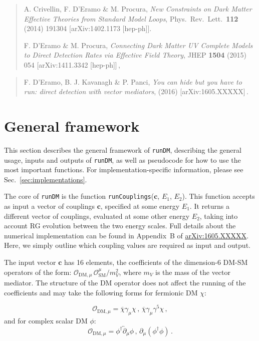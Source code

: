 \documentclass[notitlepage,12pt]{article}
\newcommand{\runDM}{\texttt{runDM}\xspace}
\newcommand{\ourpaper}{\href{http://arxiv.org/abs/1605.XXXXX}{arXiv:1605.XXXXX}\xspace}
\begin{document}
\begin{quote}

 A. Crivellin, F. D'Eramo \& M. Procura, \textit{New Constraints on Dark Matter Effective Theories from Standard Model Loops}, Phys.\ Rev.\ Lett.\  {\bf 112} (2014) 191304 [arXiv:1402.1173 [hep-ph]].

F. D'Eramo \& M. Procura, \textit{Connecting Dark Matter UV Complete Models to Direct Detection Rates via Effective Field Theory}, JHEP {\bf 1504} (2015) 054 [arXiv:1411.3342 [hep-ph]]\,,
\end{quote}

\begin{quote}
F. D'Eramo, B. J. Kavanagh \& P. Panci, \textit{You can hide but you have to run: direct detection with vector mediators}, (2016) [arXiv:1605.XXXXX]\,.
\end{quote}


\section{General framework}

This section describes the general framework of \runDM, describing the general usage, inputs and outputs of \runDM, as well as pseudocode for how to use the most important functions. For implementation-specific information, please see Sec.~\ref{sec:implementations}.

The core of \runDM is the function \texttt{runCouplings}($\mathbf{c}$, $E_1$, $E_2$). This function accepts as input a vector of couplings $\mathbf{c}$, specified at some energy $E_1$. It returns a different vector of couplings, evaluated at some other energy $E_2$, taking into account RG evolution between the two energy scales. Full details about the numerical implementation can be found in Appendix~B of \ourpaper. Here, we simply outline which coupling values are required as input and output.

The input vector  $\mathbf{c}$ has 16 elements, the coefficients of the dimension-6 DM-SM operators of the form: $\mathcal{O}_{\mathrm{DM},\mu} \, \mathcal{O}_\mathrm{SM}^\mu/m_V^2$, where $m_V$ is the mass of the vector mediator. The structure of the DM operator does not affect the running of the coefficients and may take the following forms for fermionic DM $\chi$:

\begin{equation}
\mathcal{O}_{\mathrm{DM},\mu} = \overline{\chi}\gamma_\mu \chi\,, \,\overline{\chi} \gamma_\mu \gamma^5 \chi\,,
\end{equation}
and for complex scalar DM $\phi$:
\begin{equation}
\mathcal{O}_{\mathrm{DM},\mu} = \phi^\dagger \overleftrightarrow{\partial}_\mu \phi\, , \, \partial_\mu (\phi^\dagger \phi)\,.\end{equation}
\end{document}
